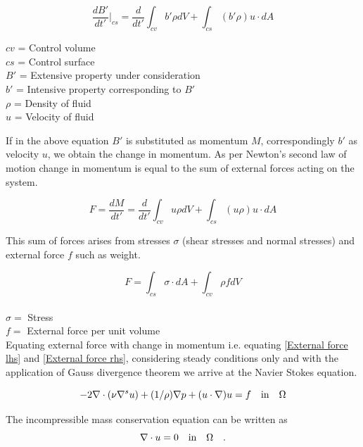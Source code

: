 \documentclass[a4paper,12pt]{book}
\begin{document}
\begin{equation} \label{rtt} 
\frac{dB'}{dt'}|_{cs} = \frac{d}{dt'} \int_{cv} b' \rho dV + \int_{cs} (b' \rho) u\cdot dA 
\end{equation}

\begin{center}
$cv$ = Control volume\\
$cs$ = Control surface\\
$B'$ = Extensive property under consideration  \\
$b'$ = Intensive property corresponding to $B'$ \\
$\rho$ = Density of fluid \\
$u$ = Velocity of fluid\\
\end{center}

If in the above equation $B'$ is substituted as momentum $M$, correspondingly $b'$ as velocity $u$, we obtain the change in momentum. As per Newton's second law of motion change in momentum is equal to the sum of external forces acting on the system. 

\begin{equation}\label{External force lhs}
F = \frac{dM}{dt'} = \frac{d}{dt'} \int_{cv} u \rho dV + \int_{cs} (u \rho) u\cdot dA 
\end{equation}

This sum of forces arises from stresses $\sigma$ (shear stresses and normal stresses) and external force $f$ such as weight. 

\begin{equation}\label{External force rhs}
F = \int_{cs} \sigma \cdot dA + \int_{cv} \rho f dV
\end{equation}
\\
$\sigma =$ Stress\\
$f =$ External force per unit volume\\

Equating external force with change in momentum i.e. equating \eqref{External force lhs} and \eqref{External force rhs}, considering steady conditions only and with the application of Gauss divergence theorem we arrive at the Navier Stokes equation.

\begin{equation} \label{navier_stokes}
-2\nabla \cdot (\nu \nabla^s u) + (1/\rho) \nabla p + (u \cdot \nabla)u = f \quad   \textnormal{in}  \quad \Omega
\end{equation} 

The incompressible mass conservation equation can be written as
\begin{equation}\label{mass_conservation}
\nabla \cdot u=0 \quad   \textnormal{in}  \quad \Omega \quad \textrm{.}
\end{equation}
\end{document}
